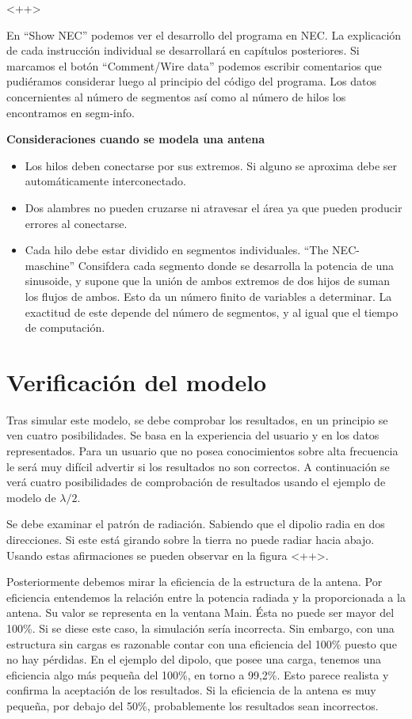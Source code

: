 \documentclass[12pt]{article}
\begin{document}
<++> 

En “Show NEC” podemos ver el desarrollo del programa en NEC. La explicación de
cada instrucción individual se desarrollará en capítulos posteriores. Si
marcamos el botón ``Comment/Wire data'' podemos escribir comentarios que
pudiéramos considerar luego al principio del código del programa. Los datos
concernientes al número de segmentos así como al número de hilos los
encontramos en segm-info.

\textbf{Consideraciones cuando se modela una antena}

\begin{itemize}%
    \item Los hilos deben conectarse por sus extremos. Si alguno se aproxima
	debe ser autom\'aticamente interconectado.
    \item Dos alambres no pueden cruzarse ni atravesar el \'area ya que pueden
	producir errores al conectarse.
    \item Cada hilo debe estar dividido en segmentos individuales. ``The
	NEC-maschine'' Consifdera cada segmento donde se desarrolla la potencia
	de una sinusoide, y supone que la uni\'on de ambos extremos de dos
	hijos de suman los flujos de ambos. Esto da un n\'umero finito de
	variables a determinar. La exactitud de este depende del n\'umero de
	segmentos, y al igual que el tiempo de computaci\'on.
\end{itemize}

\section{Verificaci\'on del modelo}

Tras simular este modelo, se debe comprobar los resultados, en un principio se
ven cuatro posibilidades. Se basa en la experiencia del usuario y en los datos
representados. Para un usuario que no posea conocimientos sobre alta frecuencia
le ser\'a muy difícil advertir si los resultados no son correctos. A
continuaci\'on se ver\'a cuatro posibilidades de comprobaci\'on de resultados
usando el ejemplo de modelo de $\lambda/2$.

Se debe examinar el patr\'on de radiaci\'on. Sabiendo que el dipolio radia en dos direcciones. Si este est\'a girando sobre la tierra no puede radiar hacia abajo. Usando estas afirmaciones se pueden observar en la figura <++>.

Posteriormente debemos mirar la eficiencia de la estructura de la antena. Por eficiencia entendemos la relación entre la potencia radiada y la proporcionada a la antena. Su valor se representa en la ventana Main. Ésta no puede ser mayor del
100\%. Si se diese este caso, la simulación sería incorrecta. Sin embargo, con una
estructura sin cargas es razonable contar con una eficiencia del 100\% puesto que no hay pérdidas. En el ejemplo del dipolo, que posee una carga, tenemos una eficiencia algo más pequeña del 100\%, en torno a 99,2\%. Esto parece realista y confirma la aceptación de los resultados. Si la eficiencia de la antena es muy pequeña, por debajo del 50\%, probablemente los resultados sean incorrectos.
\end{document}
